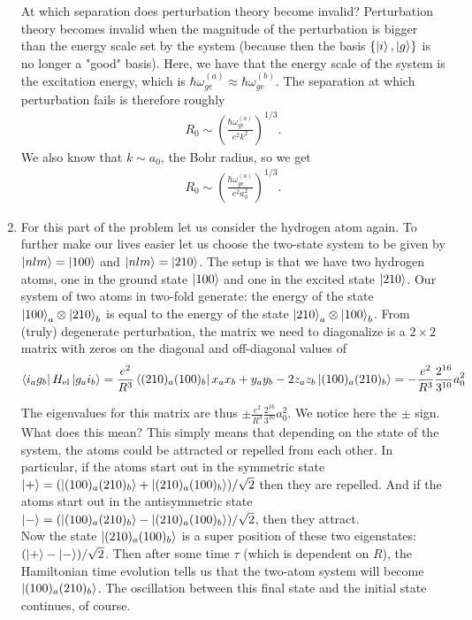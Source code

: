 \documentclass{article}
\theoremstyle{definition}
\newcommand{\f}[2]{\frac{#1}{#2}}
\newcommand{\lp}{\left(}
\newcommand{\rp}{\right)}
\begin{document}
\begin{enumerate}[label=(\alph*)]
At which separation does perturbation theory become invalid? Perturbation theory becomes invalid when the magnitude of the perturbation is bigger than the energy scale set by the system (because then the basis $\{\ket{i}, \ket{g} \}$ is no longer a "good" basis). Here, we have that the energy scale of the system is the excitation energy, which is $\hbar \omega_{ge}^{(a)} \approx \hbar \omega_{ge}^{(b)}$. The separation at which perturbation fails is therefore roughly
\begin{align*}
R_0 \sim \lp \f{\hbar \omega_{ge}^{(a)}}{ e^2 k^2} \rp^{1/3}. 
\end{align*}
We also know that $k\sim a_0$, the Bohr radius, so we get
\begin{align*}
R_0 \sim \lp \f{\hbar \omega_{ge}^{(a)}}{ e^2 a_0^2} \rp^{1/3}.
\end{align*}


\item For this part of the problem let us consider the hydrogen atom again. To further make our lives easier let us choose the two-state system to be given by $\ket{nlm} = \ket{100}$ and $\ket{nlm} = \ket{210}$. The setup is that we have two hydrogen atoms, one in the ground state $\ket{100}$ and one in the excited state $\ket{210}$. Our system of two atoms in two-fold generate: the energy of the state $\ket{100}_a \otimes \ket{210}_b$ is equal to the energy of the state $\ket{210}_a \otimes \ket{100}_b$. From (truly) degenerate perturbation, the matrix we need to diagonalize is a $2\times 2$ matrix with zeros on the diagonal and off-diagonal values of
\begin{align*}
\bra{i_a g_b} H_\text{el} \ket{g_a i_b} = \f{e^2}{R^3} \bra{(210)_a (100)_b} x_a x_b + y_a y_b - 2 z_a z_b \ket{(100)_a (210)_b} = -\f{e^2}{R^3} \f{2^{16}}{3^{10}} a_0^2 
\end{align*}

The eigenvalues for this matrix are thus $\pm \f{e^2}{R^3} \f{2^{16}}{3^{10}} a_0^2 $. We notice here the $\pm$ sign. What does this mean? This simply means that depending on the state of the system, the atoms could be attracted or repelled from each other. In particular, if the atoms start out in the symmetric state $\ket{+}  = (\ket{(100)_a (210)_b} + \ket{(210)_a (100)_b})/\sqrt{2}$ then they are repelled. And if the atoms start out in the antisymmetric state $\ket{-} = (\ket{(100)_a (210)_b} - \ket{(210)_a (100)_b})/\sqrt{2}$, then they attract. \\

Now the state $\ket{(210)_a (100)_b}$ is a super position of these two eigenstates: $(\ket{+} - \ket{-})/\sqrt{2}$. Then after some time $\tau$ (which is dependent on $R$), the Hamiltonian time evolution tells us that the two-atom system will become $\ket{(100)_a (210)_b}$. The oscillation between this final state and the initial state continues, of course. \\


\end{enumerate}
\end{document}
